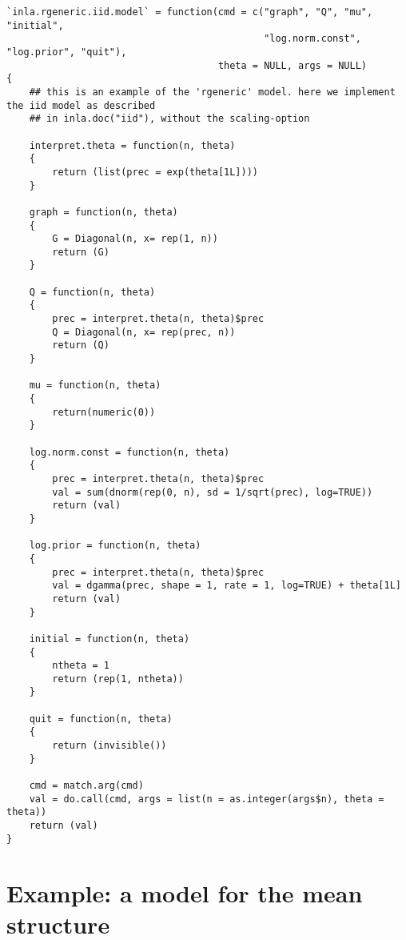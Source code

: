\documentclass[a4paper,11pt]{article}
\begin{document}
{\small
\begin{verbatim}
`inla.rgeneric.iid.model` = function(cmd = c("graph", "Q", "mu", "initial",
                                             "log.norm.const", "log.prior", "quit"),
                                     theta = NULL, args = NULL)
{
    ## this is an example of the 'rgeneric' model. here we implement the iid model as described
    ## in inla.doc("iid"), without the scaling-option

    interpret.theta = function(n, theta)
    {
        return (list(prec = exp(theta[1L])))
    }

    graph = function(n, theta)
    {
        G = Diagonal(n, x= rep(1, n))
        return (G)
    }

    Q = function(n, theta)
    {
        prec = interpret.theta(n, theta)$prec
        Q = Diagonal(n, x= rep(prec, n))
        return (Q)
    }

    mu = function(n, theta)
    {
        return(numeric(0))
    }

    log.norm.const = function(n, theta)
    {
        prec = interpret.theta(n, theta)$prec
        val = sum(dnorm(rep(0, n), sd = 1/sqrt(prec), log=TRUE))
        return (val)
    }

    log.prior = function(n, theta)
    {
        prec = interpret.theta(n, theta)$prec
        val = dgamma(prec, shape = 1, rate = 1, log=TRUE) + theta[1L]
        return (val)
    }

    initial = function(n, theta)
    {
        ntheta = 1
        return (rep(1, ntheta))
    }

    quit = function(n, theta)
    {
        return (invisible())
    }

    cmd = match.arg(cmd)
    val = do.call(cmd, args = list(n = as.integer(args$n), theta = theta))
    return (val)
}
\end{verbatim}
}

\clearpage
\section*{Example: a model for the mean structure}

{\small

}
\end{document}
